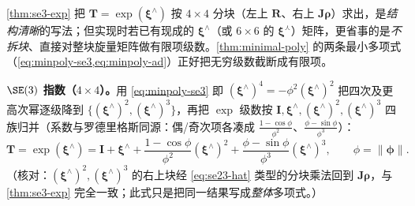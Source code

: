 \begin{derivation}\label{deriv:direct-series}
\cref{thm:se3-exp} 把 $\mathbf{T}=\exp(\boldsymbol{\xi}^\wedge)$ 按 $4\times4$ 分块（左上 $\mathbf{R}$、右上 $\mathbf{J}\boldsymbol{\rho}$）求出，是\emph{结构清晰}的写法；但实现时若已有现成的 $\boldsymbol{\xi}^\wedge$（或 $6\times6$ 的 $\boldsymbol{\xi}^\curlywedge$）矩阵，更省事的是\emph{不拆块}、直接对整块旋量矩阵做有限项级数。\cref{thm:minimal-poly} 的两条最小多项式（\cref{eq:minpoly-se3,eq:minpoly-ad}）正好把无穷级数截断成有限项\cite{barfoot2024state}。

\textbf{$\SE(3)$ 指数（$4\times4$）。}用 \cref{eq:minpoly-se3} 即 $(\boldsymbol{\xi}^\wedge)^4=-\phi^2(\boldsymbol{\xi}^\wedge)^2$ 把四次及更高次幂逐级降到 $\{(\boldsymbol{\xi}^\wedge)^2,(\boldsymbol{\xi}^\wedge)^3\}$，再把 $\exp$ 级数按 $\mathbf{I},\boldsymbol{\xi}^\wedge,(\boldsymbol{\xi}^\wedge)^2,(\boldsymbol{\xi}^\wedge)^3$ 四族归并（系数与罗德里格斯同源：偶/奇次项各凑成 $\tfrac{1-\cos\phi}{\phi^2}$、$\tfrac{\phi-\sin\phi}{\phi^3}$）：
\begin{equation}
  \mathbf{T}=\exp(\boldsymbol{\xi}^\wedge)
  =\mathbf{I}+\boldsymbol{\xi}^\wedge
   +\frac{1-\cos\phi}{\phi^2}(\boldsymbol{\xi}^\wedge)^2
   +\frac{\phi-\sin\phi}{\phi^3}(\boldsymbol{\xi}^\wedge)^3,
  \qquad \phi=\|\boldsymbol{\phi}\|.
  \label{eq:se3-exp-direct}
\end{equation}
（核对：$(\boldsymbol{\xi}^\wedge)^2,(\boldsymbol{\xi}^\wedge)^3$ 的右上块经 \cref{eq:se23-hat} 类型的分块乘法回到 $\mathbf{J}\boldsymbol{\rho}$，与 \cref{thm:se3-exp} 完全一致；此式只是把同一结果写成\emph{整体}多项式。）


\end{derivation}
